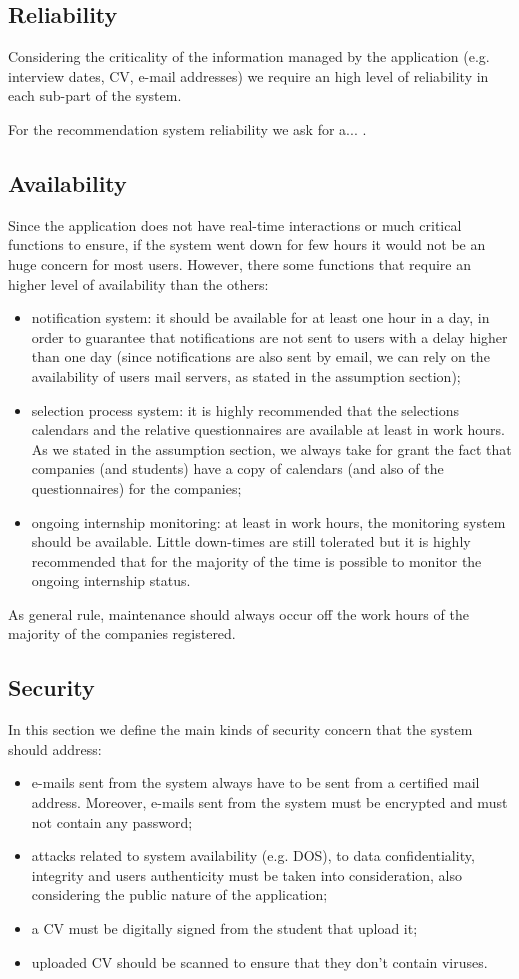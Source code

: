 		\subsection{Reliability}
			Considering the criticality of the information managed by the application (e.g. interview dates, CV, e-mail addresses) we require an high level of reliability in each sub-part of the system.
			
			For the recommendation system reliability we ask for a... .
		\subsection{Availability}
			Since the application does not have real-time interactions or much critical functions to ensure, if the system went down for few hours it would not be an huge concern for most users. However, there some functions that require an higher level of availability than the others:
			\begin{itemize}
				\item notification system: it should be available for at least one hour in a day, in order to guarantee that notifications are not sent to users with a delay higher than one day (since notifications are also sent by email, we can rely on the availability of users mail servers, as stated in the assumption section);
				\item selection process system: it is highly recommended that the selections calendars and the relative questionnaires are available at least in work hours. As we stated in the assumption section, we always take for grant the fact that companies (and students) have a copy of calendars (and also of the questionnaires) for the companies;
				\item ongoing internship monitoring: at least in work hours, the monitoring system should be available. Little down-times are still tolerated but it is highly recommended that for the majority of the time is possible to monitor the ongoing internship status.
			\end{itemize}
			As general rule, maintenance should always occur off the work hours of the majority of the companies registered.
		\subsection{Security}
			In this section we define the main kinds of security concern that the system should address:
			\begin{itemize}
				\item e-mails sent from the system always have to be sent from a certified mail address. Moreover, e-mails sent from the system must be encrypted and must not contain any password;
				\item attacks related to system availability (e.g. DOS), to data confidentiality, integrity and users authenticity must be taken into consideration, also considering the public nature of the application;
				\item a CV must be digitally signed from the student that upload it;
				\item uploaded CV should be scanned to ensure that they don't contain viruses.
			\end{itemize}
